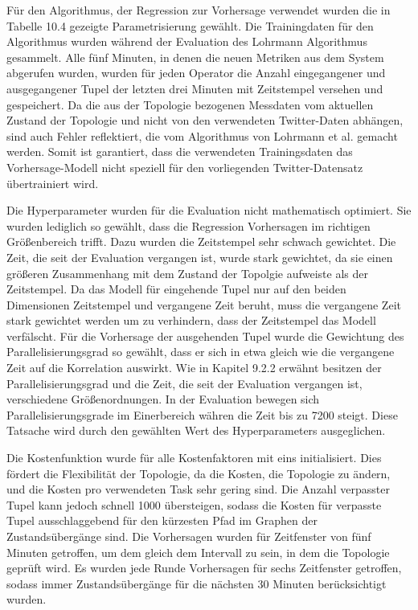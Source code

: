 Für den Algorithmus, der Regression zur Vorhersage verwendet wurden die in Tabelle 10.4 gezeigte Parametrisierung gewählt.
Die Trainingdaten für den Algorithmus wurden während der Evaluation des Lohrmann Algorithmus gesammelt.
Alle fünf Minuten, in denen die neuen Metriken aus dem System abgerufen wurden, wurden für jeden Operator die Anzahl eingegangener und ausgegangener Tupel der letzten drei Minuten mit Zeitstempel versehen und gespeichert.
Da die aus der Topologie bezogenen Messdaten vom aktuellen Zustand der Topologie und nicht von den verwendeten Twitter-Daten abhängen, sind auch Fehler reflektiert, die vom Algorithmus von Lohrmann et al. gemacht werden.
Somit ist garantiert, dass die verwendeten Trainingsdaten das Vorhersage-Modell nicht speziell für den vorliegenden Twitter-Datensatz übertrainiert wird.

Die Hyperparameter wurden für die Evaluation nicht mathematisch optimiert.
Sie wurden lediglich so gewählt, dass die Regression Vorhersagen im richtigen Größenbereich trifft.
Dazu wurden die Zeitstempel sehr schwach gewichtet.
Die Zeit, die seit der Evaluation vergangen ist, wurde stark gewichtet, da sie einen größeren Zusammenhang mit dem Zustand der Topolgie aufweiste als der Zeitstempel.
Da das Modell für eingehende Tupel nur auf den beiden Dimensionen Zeitstempel und vergangene Zeit beruht, muss die vergangene Zeit stark gewichtet werden um zu verhindern, dass der Zeitstempel das Modell verfälscht.
Für die Vorhersage der ausgehenden Tupel wurde die Gewichtung des Parallelisierungsgrad so gewählt, dass er sich in etwa gleich wie die vergangene Zeit auf die Korrelation auswirkt.
Wie in Kapitel 9.2.2 erwähnt besitzen der Parallelisierungsgrad und die Zeit, die seit der Evaluation vergangen ist, verschiedene Größenordnungen.
In der Evaluation bewegen sich Parallelisierungsgrade im Einerbereich währen die Zeit bis zu 7200 steigt.
Diese Tatsache wird durch den gewählten Wert des Hyperparameters ausgeglichen.

Die Kostenfunktion wurde für alle Kostenfaktoren mit eins initialisiert.
Dies fördert die Flexibilität der Topologie, da die Kosten, die Topologie zu ändern, und die Kosten pro verwendeten Task sehr gering sind.
Die Anzahl verpasster Tupel kann jedoch schnell 1000 übersteigen, sodass die Kosten für verpasste Tupel ausschlaggebend für den kürzesten Pfad im Graphen der Zustandsübergänge sind.
Die Vorhersagen wurden für Zeitfenster von fünf Minuten getroffen, um dem gleich dem Intervall zu sein, in dem die Topologie geprüft wird.
Es wurden jede Runde Vorhersagen für sechs Zeitfenster getroffen, sodass immer Zustandsübergänge für die nächsten 30 Minuten berücksichtigt wurden.

